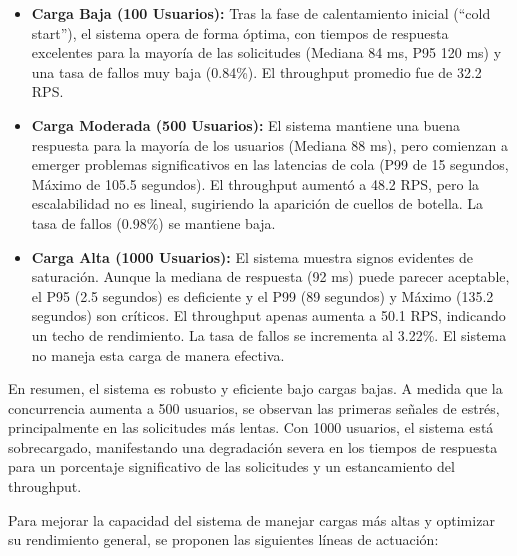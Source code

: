 \begin{itemize}
    \item \textbf{Carga Baja (100 Usuarios):} Tras la fase de calentamiento inicial (``cold start''), el sistema opera de forma óptima, con tiempos de respuesta excelentes para la mayoría de las solicitudes (Mediana 84 ms, P95 120 ms) y una tasa de fallos muy baja (0.84\%). El throughput promedio fue de 32.2 RPS.
    \item \textbf{Carga Moderada (500 Usuarios):} El sistema mantiene una buena respuesta para la mayoría de los usuarios (Mediana 88 ms), pero comienzan a emerger problemas significativos en las latencias de cola (P99 de 15 segundos, Máximo de 105.5 segundos). El throughput aumentó a 48.2 RPS, pero la escalabilidad no es lineal, sugiriendo la aparición de cuellos de botella. La tasa de fallos (0.98\%) se mantiene baja.
    \item \textbf{Carga Alta (1000 Usuarios):} El sistema muestra signos evidentes de saturación. Aunque la mediana de respuesta (92 ms) puede parecer aceptable, el P95 (2.5 segundos) es deficiente y el P99 (89 segundos) y Máximo (135.2 segundos) son críticos. El throughput apenas aumenta a 50.1 RPS, indicando un techo de rendimiento. La tasa de fallos se incrementa al 3.22\%. El sistema no maneja esta carga de manera efectiva.
\end{itemize}

En resumen, el sistema es robusto y eficiente bajo cargas bajas. A medida que la concurrencia aumenta a 500 usuarios, se observan las primeras señales de estrés, principalmente en las solicitudes más lentas. Con 1000 usuarios, el sistema está sobrecargado, manifestando una degradación severa en los tiempos de respuesta para un porcentaje significativo de las solicitudes y un estancamiento del throughput.

Para mejorar la capacidad del sistema de manejar cargas más altas y optimizar su rendimiento general, se proponen las siguientes líneas de actuación:

